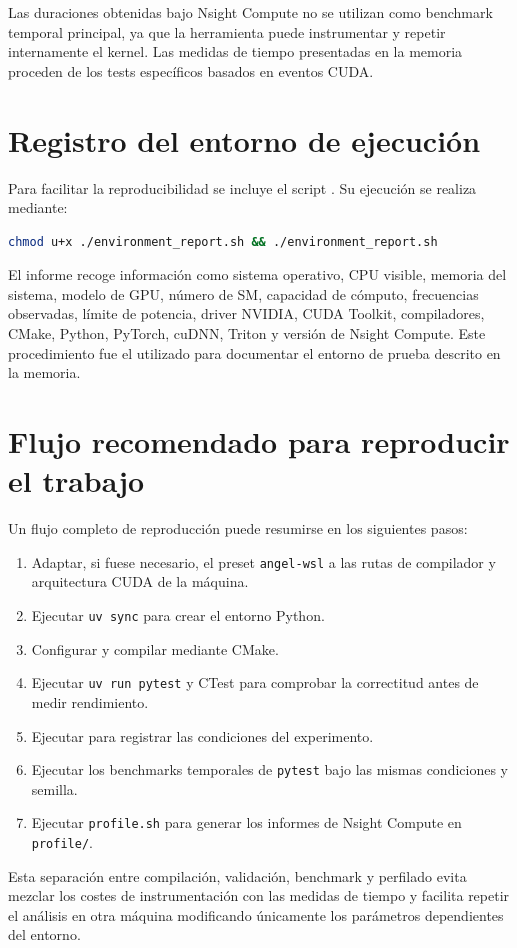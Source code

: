 Las duraciones obtenidas bajo Nsight Compute no se utilizan como benchmark temporal principal, ya que la herramienta puede instrumentar y repetir internamente el kernel. Las medidas de tiempo presentadas en la memoria proceden de los tests específicos basados en eventos CUDA.

\section{Registro del entorno de ejecución}

Para facilitar la reproducibilidad se incluye el script . Su ejecución se realiza mediante:

\begin{lstlisting}[language=bash,breaklines=true,columns=fullflexible]
chmod u+x ./environment_report.sh && ./environment_report.sh
\end{lstlisting}

El informe recoge información como sistema operativo, CPU visible, memoria del sistema, modelo de GPU, número de SM, capacidad de cómputo, frecuencias observadas, límite de potencia, driver NVIDIA, CUDA Toolkit, compiladores, CMake, Python, PyTorch, cuDNN, Triton y versión de Nsight Compute. Este procedimiento fue el utilizado para documentar el entorno de prueba descrito en la memoria.

\section{Flujo recomendado para reproducir el trabajo}

Un flujo completo de reproducción puede resumirse en los siguientes pasos:

\begin{enumerate}
    \item Adaptar, si fuese necesario, el preset \texttt{angel-wsl} a las rutas de compilador y arquitectura CUDA de la máquina.
    \item Ejecutar \texttt{uv sync} para crear el entorno Python.
    \item Configurar y compilar mediante CMake.
    \item Ejecutar \texttt{uv run pytest} y CTest para comprobar la correctitud antes de medir rendimiento.
    \item Ejecutar  para registrar las condiciones del experimento.
    \item Ejecutar los benchmarks temporales de \texttt{pytest} bajo las mismas condiciones y semilla.
    \item Ejecutar \texttt{profile.sh} para generar los informes de Nsight Compute en \texttt{profile/}.
\end{enumerate}

Esta separación entre compilación, validación, benchmark y perfilado evita mezclar los costes de instrumentación con las medidas de tiempo y facilita repetir el análisis en otra máquina modificando únicamente los parámetros dependientes del entorno.
